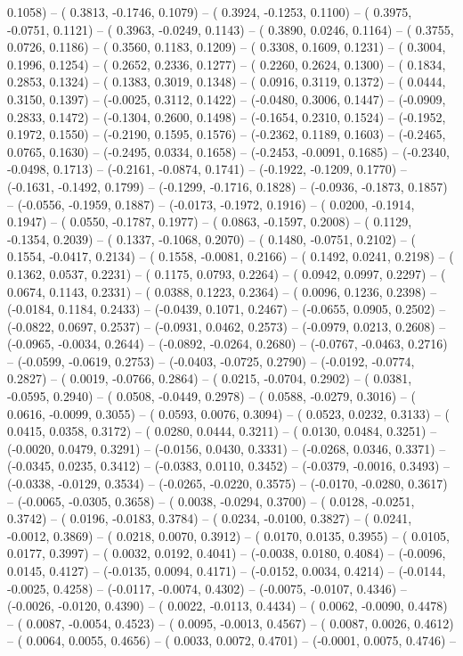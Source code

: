 0.1058) -- ( 0.3813, -0.1746,  0.1079) -- ( 0.3924, -0.1253,  0.1100) -- ( 0.3975, -0.0751,  0.1121) -- ( 0.3963, -0.0249,  0.1143) -- ( 0.3890,  0.0246,  0.1164) -- ( 0.3755,  0.0726,  0.1186) -- ( 0.3560,  0.1183,  0.1209) -- ( 0.3308,  0.1609,  0.1231) -- ( 0.3004,  0.1996,  0.1254) -- ( 0.2652,  0.2336,  0.1277) -- ( 0.2260,  0.2624,  0.1300) -- ( 0.1834,  0.2853,  0.1324) -- ( 0.1383,  0.3019,  0.1348) -- ( 0.0916,  0.3119,  0.1372) -- ( 0.0444,  0.3150,  0.1397) -- (-0.0025,  0.3112,  0.1422) -- (-0.0480,  0.3006,  0.1447) -- (-0.0909,  0.2833,  0.1472) -- (-0.1304,  0.2600,  0.1498) -- (-0.1654,  0.2310,  0.1524) -- (-0.1952,  0.1972,  0.1550) -- (-0.2190,  0.1595,  0.1576) -- (-0.2362,  0.1189,  0.1603) -- (-0.2465,  0.0765,  0.1630) -- (-0.2495,  0.0334,  0.1658) -- (-0.2453, -0.0091,  0.1685) -- (-0.2340, -0.0498,  0.1713) -- (-0.2161, -0.0874,  0.1741) -- (-0.1922, -0.1209,  0.1770) -- (-0.1631, -0.1492,  0.1799) -- (-0.1299, -0.1716,  0.1828) -- (-0.0936, -0.1873,  0.1857) -- (-0.0556, -0.1959,  0.1887) -- (-0.0173, -0.1972,  0.1916) -- ( 0.0200, -0.1914,  0.1947) -- ( 0.0550, -0.1787,  0.1977) -- ( 0.0863, -0.1597,  0.2008) -- ( 0.1129, -0.1354,  0.2039) -- ( 0.1337, -0.1068,  0.2070) -- ( 0.1480, -0.0751,  0.2102) -- ( 0.1554, -0.0417,  0.2134) -- ( 0.1558, -0.0081,  0.2166) -- ( 0.1492,  0.0241,  0.2198) -- ( 0.1362,  0.0537,  0.2231) -- ( 0.1175,  0.0793,  0.2264) -- ( 0.0942,  0.0997,  0.2297) -- ( 0.0674,  0.1143,  0.2331) -- ( 0.0388,  0.1223,  0.2364) -- ( 0.0096,  0.1236,  0.2398) -- (-0.0184,  0.1184,  0.2433) -- (-0.0439,  0.1071,  0.2467) -- (-0.0655,  0.0905,  0.2502) -- (-0.0822,  0.0697,  0.2537) -- (-0.0931,  0.0462,  0.2573) -- (-0.0979,  0.0213,  0.2608) -- (-0.0965, -0.0034,  0.2644) -- (-0.0892, -0.0264,  0.2680) -- (-0.0767, -0.0463,  0.2716) -- (-0.0599, -0.0619,  0.2753) -- (-0.0403, -0.0725,  0.2790) -- (-0.0192, -0.0774,  0.2827) -- ( 0.0019, -0.0766,  0.2864) -- ( 0.0215, -0.0704,  0.2902) -- ( 0.0381, -0.0595,  0.2940) -- ( 0.0508, -0.0449,  0.2978) -- ( 0.0588, -0.0279,  0.3016) -- ( 0.0616, -0.0099,  0.3055) -- ( 0.0593,  0.0076,  0.3094) -- ( 0.0523,  0.0232,  0.3133) -- ( 0.0415,  0.0358,  0.3172) -- ( 0.0280,  0.0444,  0.3211) -- ( 0.0130,  0.0484,  0.3251) -- (-0.0020,  0.0479,  0.3291) -- (-0.0156,  0.0430,  0.3331) -- (-0.0268,  0.0346,  0.3371) -- (-0.0345,  0.0235,  0.3412) -- (-0.0383,  0.0110,  0.3452) -- (-0.0379, -0.0016,  0.3493) -- (-0.0338, -0.0129,  0.3534) -- (-0.0265, -0.0220,  0.3575) -- (-0.0170, -0.0280,  0.3617) -- (-0.0065, -0.0305,  0.3658) -- ( 0.0038, -0.0294,  0.3700) -- ( 0.0128, -0.0251,  0.3742) -- ( 0.0196, -0.0183,  0.3784) -- ( 0.0234, -0.0100,  0.3827) -- ( 0.0241, -0.0012,  0.3869) -- ( 0.0218,  0.0070,  0.3912) -- ( 0.0170,  0.0135,  0.3955) -- ( 0.0105,  0.0177,  0.3997) -- ( 0.0032,  0.0192,  0.4041) -- (-0.0038,  0.0180,  0.4084) -- (-0.0096,  0.0145,  0.4127) -- (-0.0135,  0.0094,  0.4171) -- (-0.0152,  0.0034,  0.4214) -- (-0.0144, -0.0025,  0.4258) -- (-0.0117, -0.0074,  0.4302) -- (-0.0075, -0.0107,  0.4346) -- (-0.0026, -0.0120,  0.4390) -- ( 0.0022, -0.0113,  0.4434) -- ( 0.0062, -0.0090,  0.4478) -- ( 0.0087, -0.0054,  0.4523) -- ( 0.0095, -0.0013,  0.4567) -- ( 0.0087,  0.0026,  0.4612) -- ( 0.0064,  0.0055,  0.4656) -- ( 0.0033,  0.0072,  0.4701) -- (-0.0001,  0.0075,  0.4746) -- 